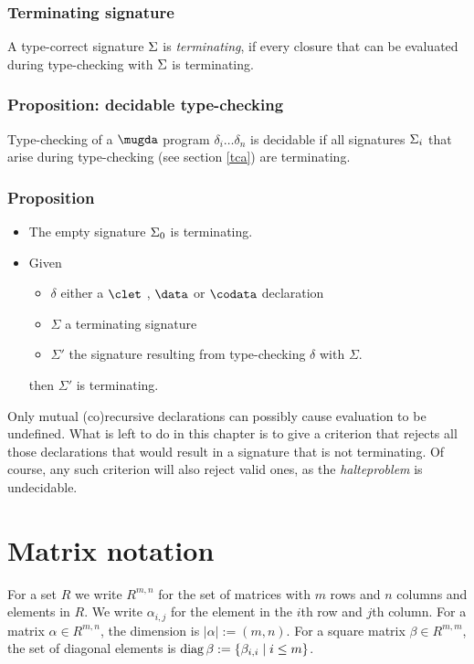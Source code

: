 \subsubsection{Terminating signature}
A type-correct signature $\Sigma$ is \emph{terminating}, if every closure that can be evaluated during type-checking with $\Sigma$ is terminating. 

\subsubsection{Proposition: decidable type-checking}
Type-checking of a $\mugda$ program $\delta_i \ldots \delta_n$ is decidable if all signatures $\Sigma_i$ that arise during type-checking (see section {\ref{tca}}) are terminating. 

\subsubsection{Proposition}
\begin{itemize}
\item
The empty signature $\Sigma_0$ is terminating.
\item
Given
\begin{itemize}
\item
$\delta$ either a $\clet$ , $\data $ or $\codata$ declaration
\item
$\Sigma$ a terminating signature 
\item
$\Sigma'$ the signature resulting from type-checking $\delta$ with $\Sigma$. 
\end{itemize}
then $\Sigma'$ is terminating. 
\end{itemize}
\noindent Only mutual (co)recursive declarations can possibly cause evaluation to be undefined.
What is left to do in this chapter is to give a criterion that rejects all those declarations that would result in a signature that is not terminating. Of course, any such criterion will also reject valid ones, as the \emph{halteproblem} is undecidable.

\section{Matrix notation}

\newcommand{\diag}{\opn{diag}}

For a set $R$ we write $R^{m,n}$ for the set of matrices with $m$ rows and $n$ columns and elements in $R$.
We write $\alpha_{i,j}$ for the element in the $i$th row and $j$th column.
For a matrix $\alpha \in R^{m,n}$, the dimension is $\vert\alpha\vert := (m,n)$.
For a square matrix $\beta \in R^{m,m}$, the set of diagonal elements is $\diag \beta := \{ \beta_{i,i} \mid i \leq m\}$.

